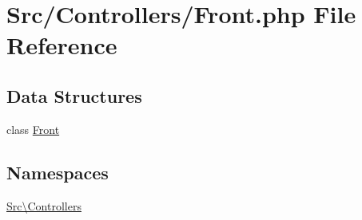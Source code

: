 \hypertarget{_front_8php}{}\section{Src/\+Controllers/\+Front.php File Reference}
\label{_front_8php}
\subsection*{Data Structures}
\begin{DoxyCompactItemize}
\item 
class \hyperlink{class_src_1_1_controllers_1_1_front}{Front}
\end{DoxyCompactItemize}
\subsection*{Namespaces}
\begin{DoxyCompactItemize}
\item 
 \hyperlink{namespace_src_1_1_controllers}{Src\textbackslash{}\+Controllers}
\end{DoxyCompactItemize}
